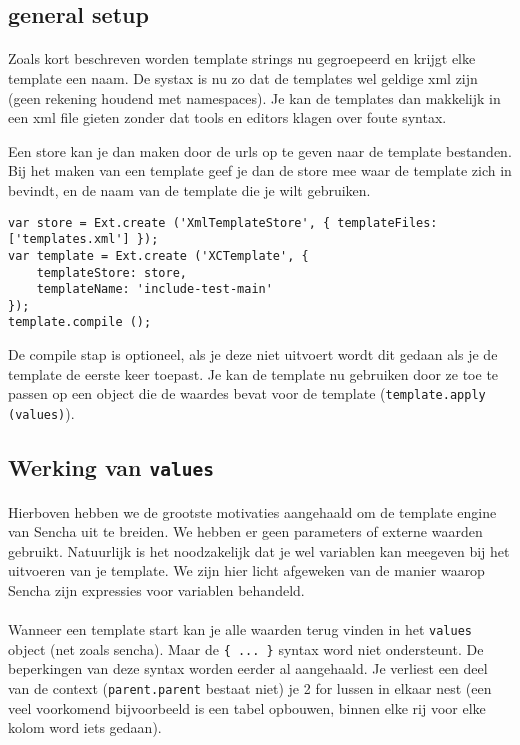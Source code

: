 \subsection {general setup}

\paragraph {} Zoals kort beschreven worden template strings nu gegroepeerd en krijgt elke
template een naam. De systax is nu zo dat de templates wel geldige xml zijn (geen
rekening houdend met namespaces). Je kan de templates dan makkelijk in een xml file
gieten zonder dat tools en editors klagen over foute syntax.

Een store kan je dan maken door de urls op te geven naar de template bestanden. Bij het
maken van een template geef je dan de store mee waar de template zich in bevindt, en de
naam van de template die je wilt gebruiken.

\begin{lstlisting}[language=ownjavascript]
var store = Ext.create ('XmlTemplateStore', { templateFiles: ['templates.xml'] });
var template = Ext.create ('XCTemplate', {
	templateStore: store,
	templateName: 'include-test-main'
});
template.compile ();
\end{lstlisting}

De compile stap is optioneel, als je deze niet uitvoert wordt dit gedaan als je de
template de eerste keer toepast. Je kan de template nu gebruiken door ze toe te passen op
een object die de waardes bevat voor de template (\lstinline{template.apply (values)}).


\subsection {Werking van \lstinline {values}}

\paragraph {} Hierboven hebben we de grootste motivaties aangehaald om de template engine
van Sencha uit te breiden. We hebben er geen parameters of externe waarden gebruikt.
Natuurlijk is het noodzakelijk dat je wel variablen kan meegeven bij het uitvoeren van je
template. We zijn hier licht afgeweken van de manier waarop Sencha zijn expressies voor
variablen behandeld.

\paragraph {} Wanneer een template start kan je alle waarden terug vinden in het
\lstinline{values} object (net zoals sencha). Maar de \lstinline|{ ... }| syntax word niet
ondersteunt. De beperkingen van deze syntax worden eerder al aangehaald. Je verliest een
deel van de context (\lstinline{parent.parent} bestaat niet) je 2 for lussen in elkaar
nest (een veel voorkomend bijvoorbeeld is een tabel opbouwen, binnen elke rij voor elke
kolom word iets gedaan).

